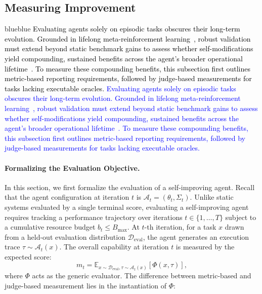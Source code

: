 \documentclass{article}
\let\oldtextcolor\textcolor
\renewcommand{\textcolor}[2]{
  \def\temp{#1}
  \def\red{blue}
  \ifx\temp\red
    \oldtextcolor{black}{#2}
  \else
    \oldtextcolor{#1}{#2}
  \fi
}
\begin{document}
\subsection{Measuring Improvement}
\label{sec:Measuring_Improvement}


\textcolor{blue}{Evaluating agents solely on episodic tasks obscures their long-term evolution. Grounded in lifelong meta-reinforcement learning~\citep{Schmidhuber1994OnLH}, robust validation must extend beyond static benchmark gains to assess whether self-modifications yield compounding, sustained benefits across the agent's broader operational lifetime~\citep{schmidhuber1997shifting, schmidhuber1998reinforcement, schmidhuber1999general}. To measure these compounding benefits, this subsection first outlines metric-based reporting requirements, followed by judge-based measurements for tasks lacking executable oracles.}


\paragraph{Formalizing the Evaluation Objective.}
In this section, we first formalize the evaluation of a self-improving agent. Recall that the agent configuration at iteration $t$ is $\mathcal{A}_t = (\theta_t, \Sigma_t)$. Unlike static systems evaluated by a single terminal score, evaluating a self-improving agent requires tracking a performance trajectory over iterations $t \in \{1, \dots, T\}$ subject to a cumulative resource budget $b_t \le B_{\text{max}}$. At $t$-th iteration, for a task $x$ drawn from a held-out evaluation distribution $\mathcal{D}_{\text{eval}}$, the agent generates an execution trace $\tau \sim \mathcal{A}_t(x)$. The overall capability at iteration $t$ is measured by the expected score:
\begin{equation}
m_t = \mathbb{E}_{x \sim \mathcal{D}_{\text{eval}}, \tau \sim \mathcal{A}_t(x)} \left[ \Phi(x, \tau) \right],
\end{equation}
where $\Phi$ acts as the generic evaluator. The  difference between metric-based and judge-based measurement lies in the instantiation of $\Phi$:
\end{document}
